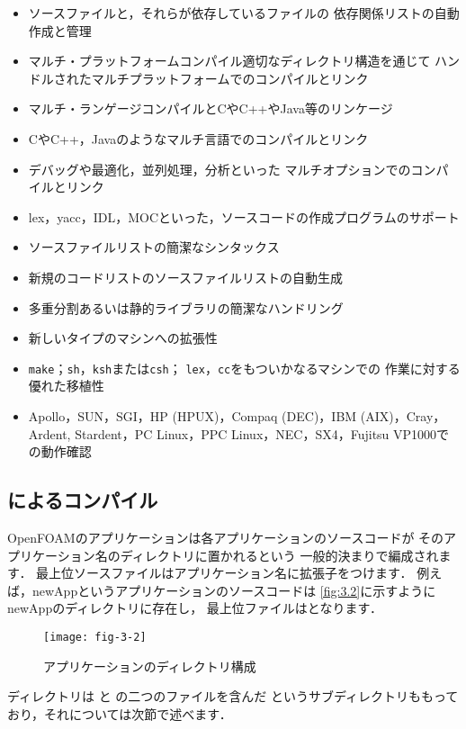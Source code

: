 \begin{itemize}
 \item ソースファイルと，それらが依存しているファイルの
       依存関係リストの自動作成と管理
 \item マルチ・プラットフォームコンパイル適切なディレクトリ構造を通じて
       ハンドルされたマルチプラットフォームでのコンパイルとリンク
 \item マルチ・ランゲージコンパイルとCやC++やJava等のリンケージ
 \item CやC++，Javaのようなマルチ言語でのコンパイルとリンク
 \item デバッグや最適化，並列処理，分析といった
       マルチオプションでのコンパイルとリンク
 \item lex，yacc，IDL，MOCといった，ソースコードの作成プログラムのサポート
 \item ソースファイルリストの簡潔なシンタックス
 \item 新規のコードリストのソースファイルリストの自動生成
 \item 多重分割あるいは静的ライブラリの簡潔なハンドリング
 \item 新しいタイプのマシンへの拡張性
 \item \texttt{make}；\texttt{sh}，\texttt{ksh}または\texttt{csh}；
       \texttt{lex}，\texttt{cc}をもついかなるマシンでの
       作業に対する優れた移植性
 \item Apollo，SUN，SGI，HP (HPUX)，Compaq (DEC)，IBM (AIX)，Cray，Ardent,
       Stardent，PC Linux，PPC Linux，NEC，SX4，Fujitsu VP1000での動作確認
\end{itemize}


\subsection{によるコンパイル}
\label{ssec:3.2.2}
OpenFOAMのアプリケーションは各アプリケーションのソースコードが
そのアプリケーション名のディレクトリに置かれるという
一般的決まりで編成されます．
最上位ソースファイルはアプリケーション名に拡張子をつけます．
例えば，newAppというアプリケーションのソースコードは
\autoref{fig:3.2}に示すようにnewAppのディレクトリに存在し，
最上位ファイルはとなります．


\begin{figure}[ht]
 \texttt{[image: fig-3-2]}
 \caption{アプリケーションのディレクトリ構成}
 \label{fig:3.2}
\end{figure}


ディレクトリは
%
%
と
%
%
の二つのファイルを含んだ
%
%
というサブディレクトリももっており，それについては次節で述べます．

